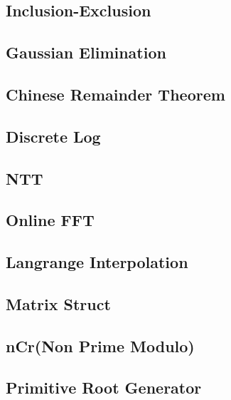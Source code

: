 \subsection{Inclusion-Exclusion}
\raggedbottom

\subsection{Gaussian Elimination}
\raggedbottom

\subsection{Chinese Remainder Theorem}
\raggedbottom
\subsection{Discrete Log}
\raggedbottom
\subsection{NTT}
\raggedbottom
\subsection{Online FFT}
\raggedbottom
\subsection{Langrange Interpolation}
\raggedbottom
\subsection{Matrix Struct}
\raggedbottom
\subsection{nCr(Non Prime Modulo)}
\raggedbottom
\subsection{Primitive Root Generator}
\raggedbottom
